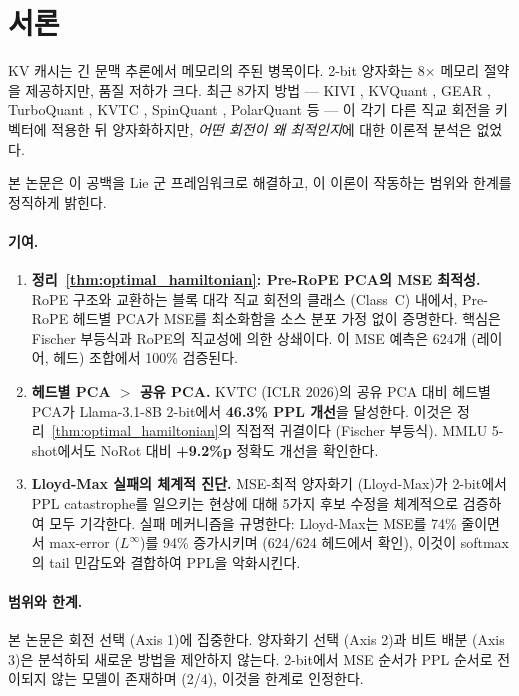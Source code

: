 \section{서론}
\label{sec:intro}

KV 캐시는 긴 문맥 추론에서 메모리의 주된 병목이다. 2-bit 양자화는 8$\times$ 메모리 절약을 제공하지만, 품질 저하가 크다. 최근 8가지 방법 --- KIVI \citep{liu2024kivi}, KVQuant \citep{hooper2024kvquant}, GEAR \citep{kang2024gear}, TurboQuant \citep{zandieh2025turboquant}, KVTC \citep{staniszewski2025kvtc}, SpinQuant \citep{liu2024spinquant}, PolarQuant \citep{wu2025polarquant} 등 --- 이 각기 다른 직교 회전을 키 벡터에 적용한 뒤 양자화하지만, \emph{어떤 회전이 왜 최적인지}에 대한 이론적 분석은 없었다.

본 논문은 이 공백을 Lie 군 프레임워크로 해결하고, 이 이론이 작동하는 범위와 한계를 정직하게 밝힌다.

\paragraph{기여.}

\begin{enumerate}[leftmargin=1.5em,itemsep=2pt]
\item \textbf{정리~\ref{thm:optimal_hamiltonian}: Pre-RoPE PCA의 MSE 최적성.} RoPE 구조와 교환하는 블록 대각 직교 회전의 클래스 (Class~C) 내에서, Pre-RoPE 헤드별 PCA가 MSE를 최소화함을 소스 분포 가정 없이 증명한다. 핵심은 Fischer 부등식과 RoPE의 직교성에 의한 상쇄이다. 이 MSE 예측은 624개 (레이어, 헤드) 조합에서 100\% 검증된다.

\item \textbf{헤드별 PCA $>$ 공유 PCA.} KVTC (ICLR 2026)의 공유 PCA 대비 헤드별 PCA가 Llama-3.1-8B 2-bit에서 \textbf{46.3\% PPL 개선}을 달성한다. 이것은 정리~\ref{thm:optimal_hamiltonian}의 직접적 귀결이다 (Fischer 부등식). MMLU 5-shot에서도 NoRot 대비 \textbf{+9.2\%p} 정확도 개선을 확인한다.

\item \textbf{Lloyd-Max 실패의 체계적 진단.} MSE-최적 양자화기 (Lloyd-Max)가 2-bit에서 PPL catastrophe를 일으키는 현상에 대해 5가지 후보 수정을 체계적으로 검증하여 모두 기각한다. 실패 메커니즘을 규명한다: Lloyd-Max는 MSE를 74\% 줄이면서 max-error ($L^\infty$)를 94\% 증가시키며 (624/624 헤드에서 확인), 이것이 softmax의 tail 민감도와 결합하여 PPL을 악화시킨다.
\end{enumerate}

\paragraph{범위와 한계.} 본 논문은 회전 선택 (Axis 1)에 집중한다. 양자화기 선택 (Axis 2)과 비트 배분 (Axis 3)은 분석하되 새로운 방법을 제안하지 않는다. 2-bit에서 MSE 순서가 PPL 순서로 전이되지 않는 모델이 존재하며 (2/4), 이것을 한계로 인정한다.
